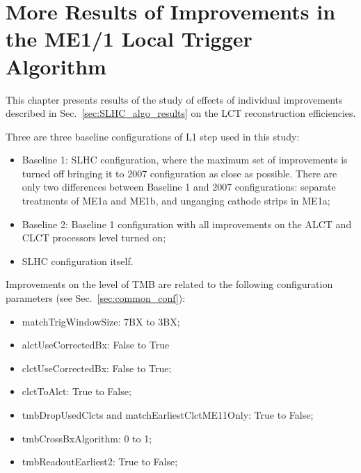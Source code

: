 \section{More Results of Improvements in the ME1/1 Local Trigger Algorithm}
\label{app:SLHC_algo_results_more_details}

This chapter presents results of the study of effects of individual improvements described in Sec.~\ref{sec:SLHC_algo_results} on the LCT reconstruction efficiencies.

Three are three baseline configurations of L1 step used in this study:
\begin{itemize}
	\item Baseline 1: SLHC configuration, where the maximum set of improvements is turned off bringing it to 2007 configuration as close as possible. 
	There are only two differences between Baseline 1 and 2007 configurations: separate treatments of ME1a and ME1b, and unganging cathode strips in ME1a;
	\item Baseline 2: Baseline 1 configuration with all improvements on the ALCT and CLCT processors level turned on;
	\item SLHC configuration itself.
\end{itemize}

Improvements on the level of TMB are related to the following configuration parameters (see Sec.~\ref{sec:common_conf}):
\begin{itemize}
	\item matchTrigWindowSize: 7BX to 3BX;
	\item alctUseCorrectedBx: False to True
	\item clctUseCorrectedBx: False to True;
	\item clctToAlct: True to False;
	\item tmbDropUsedClcts and matchEarliestClctME11Only: True to False;
	\item tmbCrossBxAlgorithm: 0 to 1;
	\item tmbReadoutEarliest2: True to False;
\end{itemize}

\newpage

